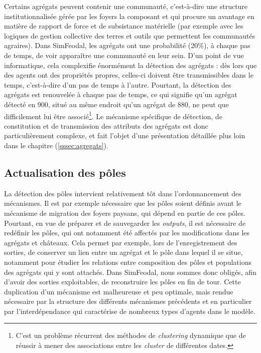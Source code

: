 Certains agrégats peuvent contenir une \og communauté\fg{}, c'est-à-dire une structure institutionnalisée gérée par les foyers la composant et qui procure un avantage en matière de rapport de force et de subsistance matérielle (par exemple avec les logiques de gestion collective des terres et outils que permettent les communautés agraires).
Dans SimFeodal, les agrégats ont une probabilité (20\%), à chaque pas de temps, de voir apparaître une communauté en leur sein.
D'un point de vue informatique, cela complexifie énormément la détection des agrégats : dès lors que des agents ont des propriétés propres, celles-ci doivent être transmissibles dans le temps, c'est-à-dire d'un pas de temps à l'autre.
Pourtant, la détection des agrégats est renouvelée à chaque pas de temps, ce qui signifie qu'un agrégat détecté en 900, situé au même endroit qu'un agrégat de 880, ne peut que difficilement lui être associé\footnote{C'est un problème récurrent des méthodes de \textit{clustering} dynamique que de réussir à mener des associations entre les \textit{cluster} de différentes dates.}.
Le mécanisme spécifique de détection, de constitution et de transmission des attributs des agrégats est donc particulièrement complexe, et fait l'objet d'une présentation détaillée plus loin dans le chapitre (\cref{sssec:agregats}).

\subsection{Actualisation des pôles}

La détection des pôles intervient relativement tôt dans l'ordonnancement des mécanismes.
Il est par exemple nécessaire que les pôles soient définis avant le mécanisme de migration des foyers paysans, qui dépend en partie de ces pôles.
Pourtant, en vue de préparer et de sauvegarder les \textit{outputs}, il est nécessaire de redéfinir les pôles, qui ont notamment été affectés par les modifications dans les agrégats et châteaux.
Cela permet par exemple, lors de l'enregistrement des sorties, de conserver un lien entre un agrégat et le pôle dans lequel il se situe, notamment pour étudier les relations entre composition des pôles et populations des agrégats qui y sont attachés.
Dans SimFeodal, nous sommes donc obligés, afin d'avoir des sorties exploitables, de reconstruire les pôles en fin de tour.
Cette duplication d'un mécanisme est malheureuse et peu optimale, mais rendue nécessaire par la structure des différents mécanismes précédents et en particulier par l'interdépendance qui caractérise de nombreux types d'agents dans le modèle.

